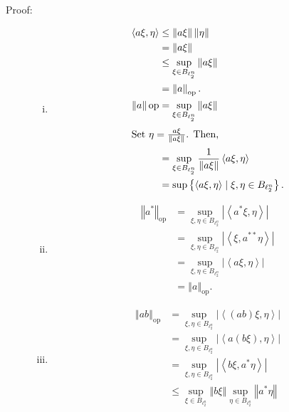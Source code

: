 \documentclass[8pt]{extarticle}
\newcommand{\iprod}[2]{\left\langle #1,#2\right\rangle}
\newcommand{\norm}[1]{\left\Vert #1\right\Vert}
\begin{document}
  \begin{description}
    \item[Proof:]\hfill
      \begin{enumerate}[(i)]
        \item 
          \begin{align*}
            \iprod{a\xi}{\eta} &\leq \norm{a\xi}\norm{\eta}\\
                               &= \norm{a\xi}\\
                               &\leq \sup_{\xi\in B_{\ell_2^{n}}}\norm{a\xi}\\
                               &= \norm{a}_{\text{op}}.\\
            \norm{a}{\text{op}} &= \sup_{\xi\in B_{\ell_2^{n}}}\norm{a\xi}\\
            \intertext{Set $\eta = \frac{a\xi}{\norm{a\xi}}$. Then,}
                                &= \sup_{\xi \in B_{\ell_2^{n}}} \frac{1}{\norm{a\xi}}\iprod{a\xi}{\eta}\\
                                &= \sup \left\{\iprod{a\xi}{\eta}\mid \xi,\eta \in B_{\ell_2^n}\right\}.
          \end{align*}
        \item
          \begin{align*}
            \norm{a^{\ast}}_{\text{op}} &= \sup_{\xi,\eta \in B_{\ell_2^n}}|\iprod{a^{\ast}\xi}{\eta}|\\
                                        &= \sup_{\xi,\eta\in B_{\ell_{2}^n}}|\iprod{\xi}{a^{\ast\ast}\eta}|\tag*{definition of conjugate transpose}\\
                                        &= \sup_{\xi,\eta\in B_{\ell_2^n}}|\iprod{a\xi}{\eta}| \tag*{by absolute value}\\
                                        &= \norm{a}_{\text{op}}.
          \end{align*}
        \item
          \begin{align*}
            \norm{ab}_{\text{op}} &= \sup_{\xi,\eta\in B_{\ell_2^n}} |\iprod{(ab)\xi}{\eta}|\\
                                  &= \sup_{\xi,\eta\in B_{\ell_2^n}}|\iprod{a(b\xi)}{\eta}|\\
                                  &= \sup_{\xi,\eta\in B_{\ell_2^n}}|\iprod{b\xi}{a^{\ast}\eta}|\\
                                  &\leq \sup_{\xi\in B_{\ell_2^n}}\norm{b\xi}\sup_{\eta\in B_{\ell_2^n}}\norm{a^{*}\eta}\\

\end{align*}
\end{enumerate}
\end{description}
\end{document}
